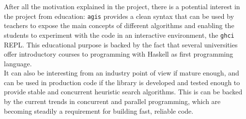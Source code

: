 After all the motivation explained in the project, there is a potential
interest in the project from education: \texttt{agis} provides a clean syntax
that can be used by teachers to expose the main concepts of different
algorithms and enabling the students to experiment with the code in an
interactive environment, the \texttt{ghci} REPL. This educational purpose is
backed by the fact that several universities offer introductory courses to
programming with Haskell as first programming language.\\

It can also be interesting from an industry point of view if mature enough, and
can be used in production code if the library is developed and tested enough to
provide stable and concurrent heuristic search algorithms. This is can be
backed by the current trends in concurrent and parallel programming, which are
becoming steadily a requirement for building fast, reliable code.\\

\newpage

